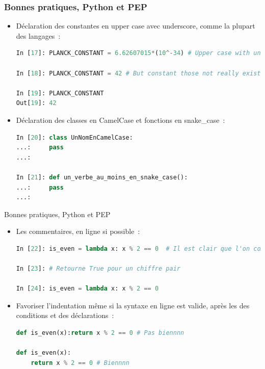 \documentclass{beamer}
\begin{document}
    \begin{frame}[fragile]
        \transdissolve
        \frametitle{Bonnes pratiques, Python et PEP}
        \begin{itemize}
            \item Déclaration des constantes en upper case avec underscore, comme la plupart des langages~:
            \begin{lstlisting}[language=python]
In [17]: PLANCK_CONSTANT = 6.62607015*(10^-34) # Upper case with underscore for constants

In [18]: PLANCK_CONSTANT = 42 # But constant those not really exists in Python

In [19]: PLANCK_CONSTANT
Out[19]: 42
            \end{lstlisting}
            \item Déclaration des classes en CamelCase et fonctions en snake\_case~:
            \begin{lstlisting}[language=python]
In [20]: class UnNomEnCamelCase:
...:     pass
...:

In [21]: def un_verbe_au_moins_en_snake_case():
...:     pass
...:
            \end{lstlisting}
        \end{itemize}

    \end{frame}

    \begin{frame}[fragile]{Bonnes pratiques, Python et PEP}
        \begin{itemize}
            \item Les commentaires, en ligne si possible~:
            \begin{lstlisting}[language=python]
In [22]: is_even = lambda x: x % 2 == 0  # Il est clair que l'on commente cette ligne mais c'est long

In [23]: # Retourne True pour un chiffre pair

In [24]: is_even = lambda x: x % 2 == 0
            \end{lstlisting}
            \item Favoriser l'indentation même si la syntaxe en ligne est valide, après les \textquote{:} des conditions et des déclarations~:
            \begin{lstlisting}[language=python]
def is_even(x):return x % 2 == 0 # Pas biennnn

def is_even(x):
    return x % 2 == 0 # Biennnn
            \end{lstlisting}
        \end{itemize}
    \end{frame}
\end{document}

